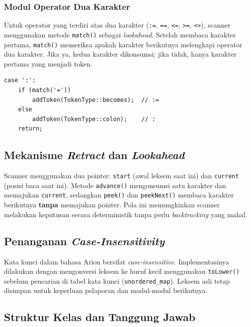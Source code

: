 \documentclass[12pt,a4paper]{article}
\begin{document}
\subsubsection{Modul Operator Dua Karakter}
Untuk operator yang terdiri atas dua karakter (\texttt{:=}, \texttt{==}, \texttt{<=}, \texttt{>=}, \texttt{<>}), scanner menggunakan metode \texttt{match()} sebagai \textit{lookahead}. Setelah membaca karakter pertama, \texttt{match()} memeriksa apakah karakter berikutnya melengkapi operator dua karakter. Jika ya, kedua karakter dikonsumsi; jika tidak, hanya karakter pertama yang menjadi token.

\begin{lstlisting}[style=cpp, caption={Contoh lookahead untuk operator :=}]
case ':':
    if (match('='))
        addToken(TokenType::becomes);  // :=
    else
        addToken(TokenType::colon);    // :
    return;
\end{lstlisting}

\subsection{Mekanisme \textit{Retract} dan \textit{Lookahead}}
Scanner menggunakan dua pointer: \texttt{start} (awal leksem saat ini) dan \texttt{current} (posisi baca saat ini). Metode \texttt{advance()} mengonsumsi satu karakter dan memajukan \texttt{current}, sedangkan \texttt{peek()} dan \texttt{peekNext()} membaca karakter berikutnya \textbf{tanpa} memajukan pointer. Pola ini memungkinkan scanner melakukan keputusan secara deterministik tanpa perlu \textit{backtracking} yang mahal.

\subsection{Penanganan \textit{Case-Insensitivity}}
Kata kunci dalam bahasa Arion bersifat \textit{case-insensitive}. Implementasinya dilakukan dengan mengonversi leksem ke huruf kecil menggunakan \texttt{toLower()} sebelum pencarian di tabel kata kunci (\texttt{unordered\_map}). Leksem asli tetap disimpan untuk keperluan pelaporan dan modul-modul berikutnya.

\subsection{Struktur Kelas dan Tanggung Jawab}
\end{document}

